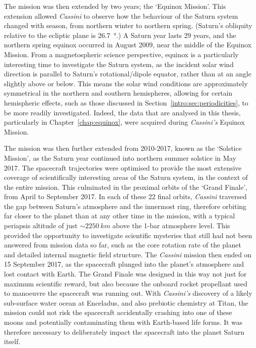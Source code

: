 The mission was then extended by two years; the `Equinox Mission'. This extension allowed \textit{Cassini} to observe how the behaviour of the Saturn system changed with season, from northern winter to northern spring. (Saturn's obliquity relative to the ecliptic plane is \SI{26.7}{\degree}.) A Saturn year lasts 29 years, and the northern spring equinox occurred in August 2009, near the middle of the Equinox Mission. From a magnetospheric science perspective, equinox is a particularly interesting time to investigate the Saturn system, as the incident solar wind direction is parallel to Saturn's rotational/dipole equator, rather than at an angle slightly above or below. This means the solar wind conditions are approximately symmetrical in the northern and southern hemispheres, allowing for certain hemispheric effects, such as those discussed in Section~\ref{intro:sec:periodicities}, to be more readily investigated. Indeed, the data that are analysed in this thesis, particularly in Chapter~\ref{chap:equinox}, were acquired during \textit{Cassini's} Equinox Mission.

The mission was then further extended from 2010-2017, known as the `Solstice Mission', as the Saturn year continued into northern summer solstice in May 2017. The spacecraft trajectories were optimised to provide the most extensive coverage of scientifically interesting areas of the Saturn system, in the context of the entire mission. This culminated in the proximal orbits of the `Grand Finale', from April to September 2017. In each of these 22 final orbits, \textit{Cassini} traversed the gap between Saturn's atmosphere and the innermost ring, therefore orbiting far closer to the planet than at any other time in the mission, with a typical periapsis altitude of just ${\sim}\SI{2250}{km}$ above the 1-bar atmosphere level. This provided the opportunity to investigate scientific mysteries that still had not been answered from mission data so far, such as the core rotation rate of the planet and detailed internal magnetic field structure. The \textit{Cassini} mission then ended on 15 September 2017, as the spacecraft plunged into the planet's atmosphere and lost contact with Earth. The Grand Finale was designed in this way not just for maximum scientific reward, but also because the onboard rocket propellant used to manoeuvre the spacecraft was running out. With \textit{Cassini's} discovery of a likely sub-surface water ocean at Enceladus, and also prebiotic chemistry at Titan, the mission could not risk the spacecraft accidentally crashing into one of these moons and potentially contaminating them with Earth-based life forms. It was therefore necessary to deliberately impact the spacecraft into the planet Saturn itself.


